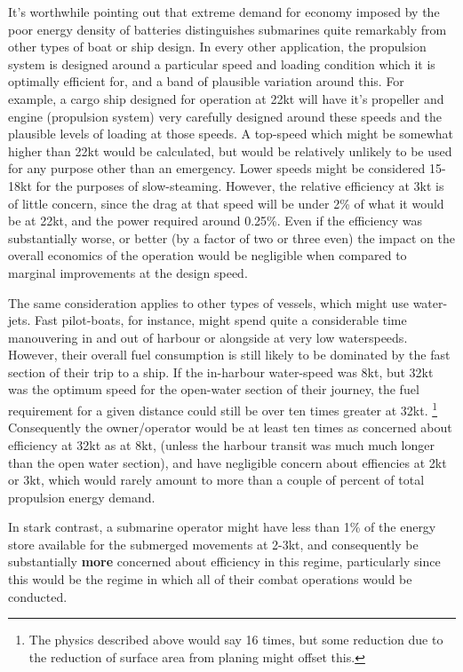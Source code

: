 \documentclass{article}\usepackage[]{graphicx}\usepackage[]{color}
\begin{document}
It's worthwhile pointing out that extreme demand for economy imposed by the poor energy density of batteries distinguishes submarines quite remarkably from other types of boat or ship design.  In every other application, the propulsion system is designed around a particular speed and loading condition which it is optimally efficient for, and a band of plausible variation around this.  For example, a cargo ship designed for operation at 22kt will have it's propeller and engine (propulsion system) very carefully designed around these speeds and the plausible levels of loading at those speeds. A top-speed which might be somewhat higher than 22kt would be calculated, but would be relatively unlikely to be used for any purpose other than an emergency.  Lower speeds might be considered 15-18kt for the purposes of slow-steaming.  However, the relative efficiency at 3kt is of little concern, since the drag at that speed will be under 2\% of what it would be at 22kt, and the power required around 0.25\%.  Even if the efficiency was substantially worse, or better (by a factor of two or three even) the impact on the overall economics of the operation would be negligible when compared to marginal improvements at the design speed.

The same consideration applies to other types of vessels, which might use water-jets.  Fast pilot-boats, for instance, might spend quite a considerable time manouvering in and out of harbour or alongside at very low waterspeeds. However, their overall fuel consumption is still likely to be dominated by the fast section of their trip to a ship.  If the in-harbour water-speed was 8kt, but 32kt was the optimum speed for the open-water section of their journey, the fuel requirement for a given distance could still be over ten times greater at 32kt. \footnote{The physics described above would say 16 times, but some reduction due to the reduction of surface area from planing might offset this.}  Consequently the owner/operator would be at least ten times as concerned about efficiency at 32kt as at 8kt, (unless the harbour transit was much much longer than the open water section), and have negligible concern about effiencies at 2kt or 3kt, which would rarely amount to more than a couple of percent of total propulsion energy demand.

In stark contrast, a submarine operator might have less than 1\% of the energy store available for the submerged movements at 2-3kt, and consequently be substantially \textbf{more} concerned about efficiency in this regime, particularly since this would be the regime in which all of their combat operations would be conducted.
\end{document}
